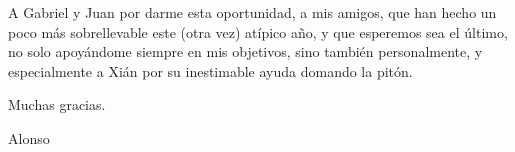 \documentclass[11pt,a4paper,titlepage,twoside,openright,openbib,spanish]{report}
\begin{document}


\paxinaenbranco
\begin{flushright}
\end{flushright}
\paxinaenbranco
\paxinaenbranco
\begin{agradecementos}
A Gabriel y Juan por darme esta oportunidad, a mis amigos, que han hecho un poco más sobrellevable este (otra vez) atípico año, y que esperemos sea el último, no solo apoyándome siempre en mis objetivos, sino también personalmente, y especialmente a Xián por su inestimable ayuda domando la pitón.

Muchas gracias.

\begin{flushright}
Alonso
\end{flushright}
\end{agradecementos}
\pagestyle{empty}
\paxinaenbranco

\pagestyle{fancy}

\setcounter{page}{1}

\tableofcontents
\listoffigures
\listoftables
\cleardoublepage

\setcounter{page}{1}







% 
% 



\appendix
\appendixpage
% 
% 
% 

\printglossary[type=\acronymtype,title=\nomeglosarioacronimos]
\printglossary[title=\nomeglosariotermos]



\cleardoublepage
\end{document}
